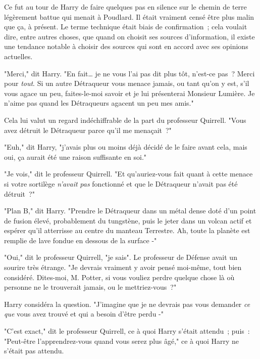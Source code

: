 Ce fut au tour de Harry de faire quelques pas en silence sur le chemin de terre légèrement battue qui menait à Poudlard. Il était vraiment censé être plus malin que ça, à présent. Le terme technique était biais de confirmation~; cela voulait dire, entre autres choses, que quand on choisit ses sources d'information, il existe une tendance notable à choisir des sources qui sont en accord avec ses opinions actuelles.

"Merci," dit Harry. "En fait… je ne vous l'ai pas dit plus tôt, n'est-ce pas~? Merci pour \emph{tout}. Si un autre Détraqueur vous menace jamais, ou tant qu'on y est, s'il vous agace un peu, faites-le-moi savoir et je lui présenterai Monsieur Lumière. Je n'aime pas quand les Détraqueurs agacent un peu mes amis."

Cela lui valut un regard indéchiffrable de la part du professeur Quirrell. "Vous avez détruit le Détraqueur parce qu'il me menaçait~?"

"Euh," dit Harry, "j'avais plus ou moins déjà décidé de le faire avant cela, mais oui, ça aurait été une raison suffisante en soi."

"Je vois," dit le professeur Quirrell. "Et qu'auriez-vous fait quant à cette menace si votre sortilège \emph{n'avait} \emph{pas} fonctionné et que le Détraqueur n'avait pas été détruit~?"

"Plan B," dit Harry. "Prendre le Détraqueur dans un métal dense doté d'un point de fusion élevé, probablement du tungstène, puis le jeter dans un volcan actif et espérer qu'il atterrisse au centre du manteau Terrestre. Ah, toute la planète est remplie de lave fondue en dessous de la surface -"

"Oui," dit le professeur Quirrell, "je sais". Le professeur de Défense avait un sourire très étrange. "Je devrais vraiment y avoir pensé moi-même, tout bien considéré. Dites-moi, M. Potter, si vous vouliez perdre quelque chose là où personne ne le trouverait jamais, ou le mettriez-vous~?"

Harry considéra la question. "J'imagine que je ne devrais pas vous demander \emph{ce que} vous avez trouvé et qui a besoin d'être perdu -"

"C'est exact," dit le professeur Quirrell, ce à quoi Harry s'était attendu~; puis~: "Peut-être l'apprendrez-vous quand vous serez plus âgé," ce à quoi Harry ne s'était pas attendu.

